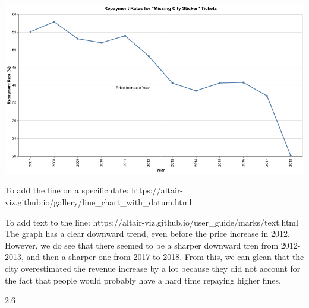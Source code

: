 \documentclass[
  letterpaper,
  DIV=11,
  numbers=noendperiod]{scrartcl}
\begin{document}
\includegraphics{ps2_answers_files/figure-pdf/cell-17-output-1.png}

To add the line on a specific date:
https://altair-viz.github.io/gallery/line\_chart\_with\_datum.html

To add text to the line:
https://altair-viz.github.io/user\_guide/marks/text.html The graph has a
clear downward trend, even before the price increase in 2012. However,
we do see that there seemed to be a sharper downward tren from
2012-2013, and then a sharper one from 2017 to 2018. From this, we can
glean that the city overestimated the revenue increase by a lot because
they did not account for the fact that people would probably have a hard
time repaying higher fines.

2.6
\end{document}
